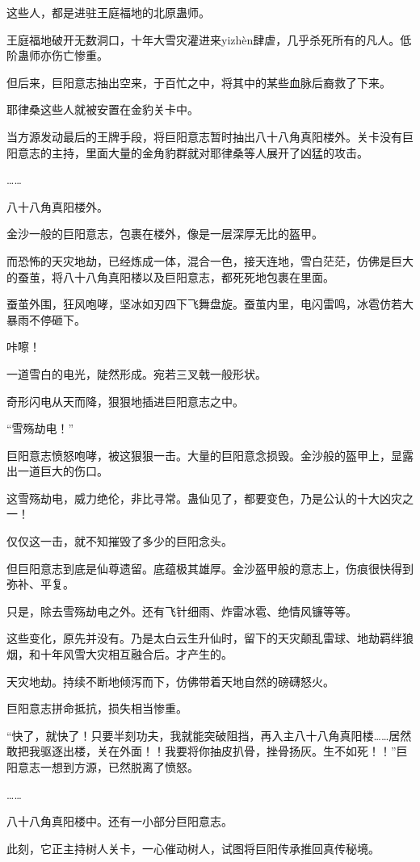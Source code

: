 \begin{this_body}
这些人，都是进驻王庭福地的北原蛊师。

王庭福地破开无数洞口，十年大雪灾灌进来yizhèn肆虐，几乎杀死所有的凡人。低阶蛊师亦伤亡惨重。

但后来，巨阳意志抽出空来，于百忙之中，将其中的某些血脉后裔救了下来。

耶律桑这些人就被安置在金豹关卡中。

当方源发动最后的王牌手段，将巨阳意志暂时抽出八十八角真阳楼外。关卡没有巨阳意志的主持，里面大量的金角豹群就对耶律桑等人展开了凶猛的攻击。

……

八十八角真阳楼外。

金沙一般的巨阳意志，包裹在楼外，像是一层深厚无比的盔甲。

而恐怖的天灾地劫，已经炼成一体，混合一色，接天连地，雪白茫茫，仿佛是巨大的蚕茧，将八十八角真阳楼以及巨阳意志，都死死地包裹在里面。

蚕茧外围，狂风咆哮，坚冰如刃四下飞舞盘旋。蚕茧内里，电闪雷鸣，冰雹仿若大暴雨不停砸下。

咔嚓！

一道雪白的电光，陡然形成。宛若三叉戟一般形状。

奇形闪电从天而降，狠狠地插进巨阳意志之中。

“雪殇劫电！”

巨阳意志愤怒咆哮，被这狠狠一击。大量的巨阳意念损毁。金沙般的盔甲上，显露出一道巨大的伤口。

这雪殇劫电，威力绝伦，非比寻常。蛊仙见了，都要变色，乃是公认的十大凶灾之一！

仅仅这一击，就不知摧毁了多少的巨阳念头。

但巨阳意志到底是仙尊遗留。底蕴极其雄厚。金沙盔甲般的意志上，伤痕很快得到弥补、平复。

只是，除去雪殇劫电之外。还有飞针细雨、炸雷冰雹、绝情风镰等等。

这些变化，原先并没有。乃是太白云生升仙时，留下的天灾颠乱雷球、地劫羁绊狼烟，和十年风雪大灾相互融合后。才产生的。

天灾地劫。持续不断地倾泻而下，仿佛带着天地自然的磅礴怒火。

巨阳意志拼命抵抗，损失相当惨重。

“快了，就快了！只要半刻功夫，我就能突破阻挡，再入主八十八角真阳楼……居然敢把我驱逐出楼，关在外面！！我要将你抽皮扒骨，挫骨扬灰。生不如死！！”巨阳意志一想到方源，已然脱离了愤怒。

……

八十八角真阳楼中。还有一小部分巨阳意志。

此刻，它正主持树人关卡，一心催动树人，试图将巨阳传承推回真传秘境。


\end{this_body}
